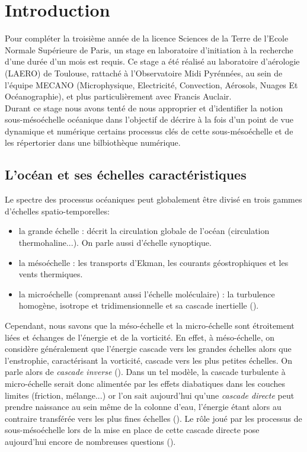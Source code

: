 \documentclass{rapportECC}
\begin{document}
\section{Introduction} 

Pour compléter la troisième année de la licence Sciences de la Terre de l'Ecole Normale Supérieure de Paris, un stage en laboratoire d'initiation à la recherche d'une durée d'un mois est requis. Ce stage a été réalisé au laboratoire d'aérologie (LAERO) de Toulouse, rattaché à l'Observatoire Midi Pyrénnées, au sein de l'équipe MECANO (Microphysique, Electricité, Convection, Aérosols, Nuages Et Océanographie), et plus particulièrement avec Francis Auclair. \\
Durant ce stage nous avons tenté de nous approprier et d'identifier la notion sous-mésoéchelle océanique dans l'objectif de décrire à la fois d'un point de vue dynamique et numérique certains processus clés de cette sous-mésoéchelle et de les répertorier dans une bilbiothèque numérique. 

\subsection{L'océan et ses échelles caractéristiques}
Le spectre des processus océaniques peut globalement être divisé en trois gammes d'échelles spatio-temporelles:
\begin{itemize}
    \item la grande échelle : décrit la circulation globale de l'océan (circulation thermohaline...). On parle aussi d'échelle synoptique.
    \item la mésoéchelle : les transports d'Ekman, les courants géostrophiques et les vents thermiques.
    \item la microéchelle (comprenant aussi l'échelle moléculaire) : la turbulence homogène, isotrope et tridimensionnelle et sa cascade inertielle (\cite{frisch_turbulence_1995}).
\end{itemize}

Cependant, nous savons que la méso-échelle et la micro-échelle sont étroitement liées et échanges de l'énergie et de la vorticité. En effet, à méso-échelle, on considère généralement que l'énergie cascade vers les grandes échelles alors que l'enstrophie, caractérisant la vorticité, cascade vers les plus petites échelles. On parle alors de \textit{cascade inverse} (\cite{vallis_atmospheric_2006}). Dans un tel modèle, la cascade turbulente à micro-échelle serait donc alimentée par les effets diabatiques dans les couches limites (friction, mélange...) or l'on sait aujourd'hui qu'une \textit{cascade directe} peut prendre naissance au sein même de la colonne d'eau, l'énergie étant alors au contraire transférée vers les plus fines échelles (\cite{taylor_submesoscale_2023}). Le rôle joué par les processus de sous-mésoéchelle lors de la mise en place de cette cascade directe pose aujourd'hui encore de nombreuses questions (\cite{McWilliams_2016}).
\end{document}
